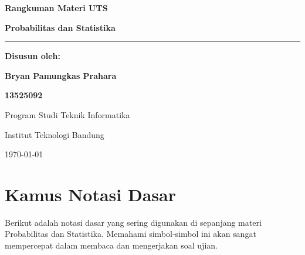 \documentclass[12pt, a4paper]{article}
\begin{document}
\begin{titlepage}
    \centering
    \vspace*{4cm}
    {\Huge \textbf{Rangkuman Materi UTS} \par}
    \vspace{0.5cm}
    {\Huge \textbf{Probabilitas dan Statistika} \par}
    \vspace{2cm}
    \hrule
    \vspace{2cm}
    {\Large \textbf{Disusun oleh:} \par}
    \vspace{0.5cm}
    {\Large \textbf{Bryan Pamungkas Prahara} \par}
    {\Large \textbf{13525092} \par}
    \vspace{2cm}
    {\large Program Studi Teknik Informatika \par}
    {\large Institut Teknologi Bandung \par}
    \vfill
    {\large \today \par}
\end{titlepage}

\newpage

\tableofcontents
\newpage

\section{Kamus Notasi Dasar}

Berikut adalah notasi dasar yang sering digunakan di sepanjang materi Probabilitas dan Statistika. Memahami simbol-simbol ini akan sangat mempercepat dalam membaca dan mengerjakan soal ujian.
\end{document}
